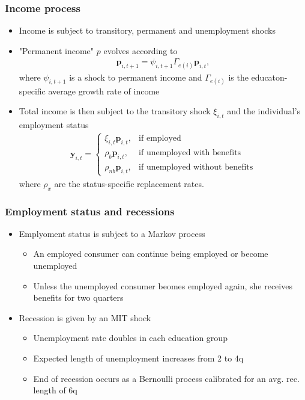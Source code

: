 \documentclass[pdflatex]{beamer}
\begin{document}
\begin{frame}
\frametitle{ Income process}

	\begin{itemize}
		\item Income is subject to transitory, permanent and unemployment shocks
		\item "Permanent income" $p$ evolves according to
		\begin{align}
		\mathbf{p}_{i,t+1} = \psi_{i,t+1}\Gamma_{e(i)}\mathbf{p}_{i,t},
		\end{align}
		where $\psi_{i,t+1}$ is a shock to permanent income and $\Gamma_{e(i)}$ is the educaton-specific average growth rate of income 
		\item Total income is then subject to the transitory shock $\xi_{i,t}$ and the individual's employment status
		\begin{align}
		\mathbf{y}_{i,t} =   \begin{cases}
		\xi_{i,t}\mathbf{p}_{i,t}, & \text{if employed} \\
		\rho_b \mathbf{p}_{i,t}, & \text{if unemployed with benefits} \\
		\rho_{nb} \mathbf{p}_{i,t}, & \text{if unemployed without benefits} 
		\end{cases}
		\end{align}
		where $\rho_x$ are the status-specific replacement rates.
	\end{itemize}

\end{frame}


\begin{frame}
\frametitle{ Employment status and recessions}

	\begin{itemize}
		\item Emplyoment status is subject to a Markov process
		\begin{itemize}
			\item An employed consumer can continue being employed or become unemployed 
			\item Unless the unemployed consumer beomes employed again, she receives benefits for two quarters
		\end{itemize}
	\end{itemize}

	\begin{itemize}
		\item Recession is given by an MIT shock
		\begin{itemize}
			\item Unemployment rate doubles in each education group
			\item Expected length of unemployment increases from 2 to 4q
			\item End of recession occurs as a Bernoulli process calibrated for an avg. rec. length of 6q
		\end{itemize}
		
	\end{itemize}

\end{frame}
\end{document}
